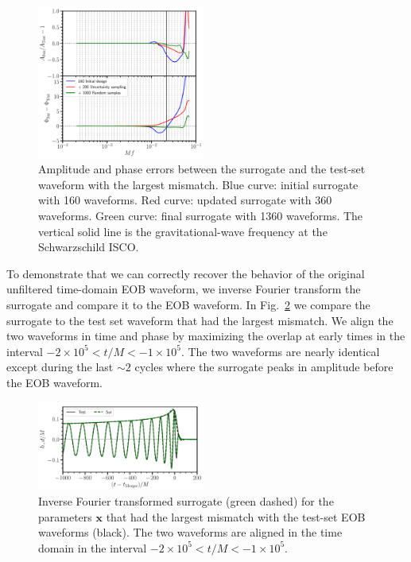\documentclass[prd,aps,letter,twocolumn,floatfix,notitlepage,nofootinbib]{revtex4-1}
\def\bx{\mathbf{x}}
\begin{document}
\begin{figure}[htb]
\centering
\includegraphics[width=0.49\textwidth]{htildemaxerror.pdf}
\caption{Amplitude and phase errors between the surrogate and the test-set waveform with the largest mismatch. Blue curve: initial surrogate with 160 waveforms. Red curve: updated surrogate with 360 waveforms. Green curve: final surrogate with 1360 waveforms. The vertical solid line is the gravitational-wave frequency at the Schwarzschild ISCO.}
\label{fig:maxmismatch}
\end{figure}

To demonstrate that we can correctly recover the behavior of the original unfiltered time-domain EOB waveform, we inverse Fourier transform the surrogate and compare it to the EOB waveform. In Fig.~\ref{fig:maxmismatchtd} we compare the surrogate to the test set waveform that had the largest mismatch. We align the two waveforms in time and phase by maximizing the overlap at early times in the interval $-2\times 10^5 < t/M < -1\times 10^5$. The two waveforms are nearly identical except during the last $\sim 2$ cycles where the surrogate peaks in amplitude before the EOB waveform.

\begin{figure}[htb]
\centering
\includegraphics[width=0.49\textwidth]{hmaxerror.pdf}
\caption{Inverse Fourier transformed surrogate (green dashed) for the parameters $\bx$ that had the largest mismatch with the test-set EOB waveforms (black). The two waveforms are aligned in the time domain in the interval $-2\times 10^5 < t/M < -1\times 10^5$.}
\label{fig:maxmismatchtd}
\end{figure}
\end{document}
